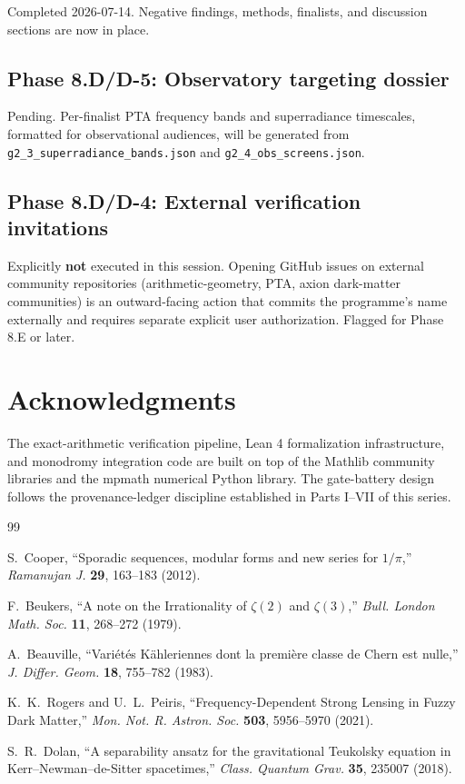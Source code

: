 \documentclass[aps,prd,twocolumn,nofootinbib,superscriptaddress,10pt]{revtex4-2}
\begin{document}
Completed 2026-07-14. Negative findings, methods, finalists, and discussion sections are now in place.

\subsection{Phase 8.D/D-5: Observatory targeting dossier}

Pending. Per-finalist PTA frequency bands and superradiance timescales, formatted for observational audiences, will be generated from \texttt{g2\_3\_superradiance\_bands.json} and \texttt{g2\_4\_obs\_screens.json}.

\subsection{Phase 8.D/D-4: External verification invitations}

Explicitly \textbf{not} executed in this session. Opening GitHub issues on external community repositories (arithmetic-geometry, PTA, axion dark-matter communities) is an outward-facing action that commits the programme's name externally and requires separate explicit user authorization. Flagged for Phase 8.E or later.

\section*{Acknowledgments}

The exact-arithmetic verification pipeline, Lean 4 formalization infrastructure, and monodromy integration code are built on top of the Mathlib community libraries and the mpmath numerical Python library. The gate-battery design follows the provenance-ledger discipline established in Parts I--VII of this series.

\begin{thebibliography}{99}

S.~Cooper,
``Sporadic sequences, modular forms and new series for $1/\pi$,''
\textit{Ramanujan J.} \textbf{29}, 163--183 (2012).

F.~Beukers,
``A note on the Irrationality of $\zeta(2)$ and $\zeta(3)$,''
\textit{Bull. London Math. Soc.} \textbf{11}, 268--272 (1979).

A.~Beauville,
``Variétés Kähleriennes dont la première classe de Chern est nulle,''
\textit{J. Differ. Geom.} \textbf{18}, 755--782 (1983).

K.~K.~Rogers and U.~L.~Peiris,
``Frequency-Dependent Strong Lensing in Fuzzy Dark Matter,''
\textit{Mon. Not. R. Astron. Soc.} \textbf{503}, 5956--5970 (2021).

S.~R.~Dolan,
``A separability ansatz for the gravitational Teukolsky equation in Kerr--Newman--de-Sitter spacetimes,''
\textit{Class. Quantum Grav.} \textbf{35}, 235007 (2018).

\end{thebibliography}
\end{document}
